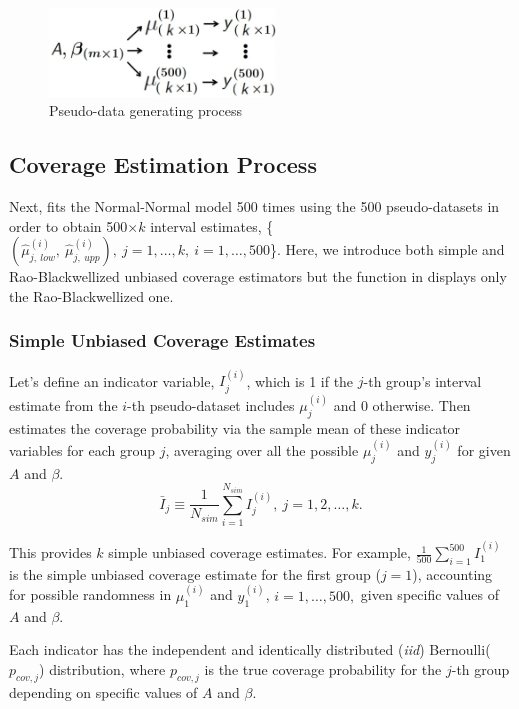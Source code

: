 \documentclass[article]{jss}
\begin{document}
\begin{figure}[h]
\begin{center}
\includegraphics[width=6cm]{process.png}
\caption{Pseudo-data generating process}
\label{fig:pseudo}
\end{center}
\end{figure}

\subsection{Coverage Estimation Process}
Next,  fits the Normal-Normal model 500 times using the 500 pseudo-datasets in order to obtain 500$\times k$ interval estimates,  \{$(\hat{\mu}^{(i)}_{j, ~low}, ~\hat{\mu}^{(i)}_{j, ~upp}), ~j=1,\ldots, k,~ i=1, \ldots, 500$\}.  Here, we introduce both simple and Rao-Blackwellized unbiased coverage estimators but the function  in  displays only the Rao-Blackwellized one.

\subsubsection{Simple Unbiased Coverage Estimates}
Let's define an indicator variable, $I^{(i)}_{j}$, which is 1 if the $j$-th group's interval estimate from the $i$-th pseudo-dataset includes $\mu^{(i)}_{j}$ and 0 otherwise. Then  estimates the coverage probability via the sample mean of these indicator variables for each group $j$, averaging over all the possible $\mu^{(i)}_{j}$ and $y^{(i)}_{j}$ for given $A$ and $\beta$. 
\begin{equation}
\bar{I}_{j}\equiv \frac{1}{N_{sim}}\sum_{i=1}^{N_{sim}}I^{(i)}_{j},~ j=1, 2, \ldots, k.
\end{equation}

This provides $k$ simple unbiased coverage estimates. For example, $\frac{1}{500}\sum_{i=1}^{500}I^{(i)}_{1}$ is the simple unbiased coverage estimate for the first group ($j=1$), accounting for possible randomness in $\mu^{(i)}_{1}$ and $y^{(i)}_{1}$, $i=1, \ldots, 500,$ given specific values of $A$ and $\beta$. 

Each indicator has the independent and identically distributed (\emph{iid}) Bernoulli($p_{cov, j}$) distribution, where $p_{cov, j}$ is the true coverage probability for the $j$-th group depending on specific values of $A$ and $\beta$.
\end{document}
